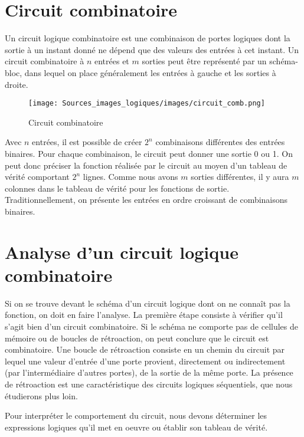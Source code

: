 \documentclass[letter, oneside]{book}
\begin{document}
\section{Circuit combinatoire}
\label{sec:org73a5bfc}

Un circuit logique combinatoire est une combinaison de portes logiques
dont la sortie à un instant donné ne dépend que des valeurs des
entrées à cet instant. Un circuit combinatoire à \(n\) entrées et
\(m\) sorties peut être représenté par un schéma-bloc, dans lequel on
place généralement les entrées à gauche et les sorties à droite.

\begin{figure}[htbp]
\centering
\texttt{[image: Sources\_images\_logiques/images/circuit\_comb.png]}
\caption{\label{fig:org107fe41}Circuit combinatoire}
\end{figure}

Avec \(n\) entrées, il est possible de créer \(2^n\) combinaisons
différentes des entrées binaires. Pour chaque combinaison, le circuit
peut donner une sortie 0 ou 1. On peut donc préciser la fonction
réalisée par le circuit au moyen d'un tableau de vérité comportant \(2^n\)
lignes. Comme nous avons \(m\) sorties différentes, il y aura \(m\)
colonnes dans le tableau de vérité pour les fonctions de
sortie. Traditionnellement, on présente les entrées en ordre croissant
de combinaisons binaires.

\section{Analyse d'un circuit logique combinatoire}
\label{sec:org81ef8eb}

Si on se trouve devant le schéma d'un circuit logique dont on ne
connaît pas la fonction, on doit en faire l'analyse. La première étape
consiste à vérifier qu'il s'agit bien d'un circuit combinatoire. Si le
schéma ne comporte pas de cellules de mémoire ou de boucles de
rétroaction, on peut conclure que le circuit est combinatoire. Une
boucle de rétroaction consiste en un chemin du circuit par
lequel une valeur d'entrée d'une porte provient, directement ou
indirectement (par l'intermédiaire d'autres portes), de la sortie de
la même porte. La présence de rétroaction est une caractéristique des
circuits logiques séquentiels, que nous étudierons plus loin.

Pour interpréter le comportement du circuit, nous devons déterminer
les expressions logiques qu'il met en oeuvre ou établir son tableau de
vérité.
\end{document}
